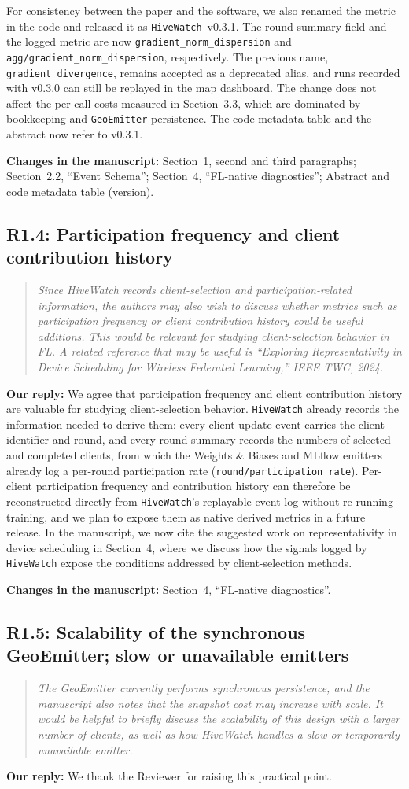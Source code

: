 \documentclass[11pt]{article}
\newenvironment{reviewer}{\begin{quote}\itshape\color{blue}}{\end{quote}}
\newcommand{\comment}[2]{\subsection*{R#1: #2}}
\newcommand{\response}{\noindent\textbf{Our reply:} }
\newcommand{\location}[1]{\noindent\textbf{Changes in the manuscript:} #1}
\newcommand{\HW}{\texttt{HiveWatch}}
\begin{document}
For consistency between the paper and the software, we also renamed the metric in the code and released it as \HW{}~v0.3.1. The round-summary field and the logged metric are now \texttt{gradient\_norm\_dispersion} and \texttt{agg/gradient\_norm\_dispersion}, respectively. The previous name, \texttt{gradient\_divergence}, remains accepted as a deprecated alias, and runs recorded with v0.3.0 can still be replayed in the map dashboard. The change does not affect the per-call costs measured in Section~3.3, which are dominated by bookkeeping and \texttt{GeoEmitter} persistence. The code metadata table and the abstract now refer to v0.3.1.

\location{Section~1, second and third paragraphs; Section~2.2, ``Event Schema''; Section~4, ``FL-native diagnostics''; Abstract and code metadata table (version).}

\comment{1.4}{Participation frequency and client contribution history}
\begin{reviewer}
Since HiveWatch records client-selection and participation-related information, the authors may also wish to discuss whether metrics such as participation frequency or client contribution history could be useful additions. This would be relevant for studying client-selection behavior in FL. A related reference that may be useful is ``Exploring Representativity in Device Scheduling for Wireless Federated Learning,'' IEEE TWC, 2024.
\end{reviewer}
\response We agree that participation frequency and client contribution history are valuable for studying client-selection behavior. \HW{} already records the information needed to derive them: every client-update event carries the client identifier and round, and every round summary records the numbers of selected and completed clients, from which the Weights \& Biases and MLflow emitters already log a per-round participation rate (\texttt{round/participation\_rate}). Per-client participation frequency and contribution history can therefore be reconstructed directly from \HW{}'s replayable event log without re-running training, and we plan to expose them as native derived metrics in a future release. In the manuscript, we now cite the suggested work on representativity in device scheduling in Section~4, where we discuss how the signals logged by \HW{} expose the conditions addressed by client-selection methods.

\location{Section~4, ``FL-native diagnostics''.}

\comment{1.5}{Scalability of the synchronous GeoEmitter; slow or unavailable emitters}
\begin{reviewer}
The GeoEmitter currently performs synchronous persistence, and the manuscript also notes that the snapshot cost may increase with scale. It would be helpful to briefly discuss the scalability of this design with a larger number of clients, as well as how HiveWatch handles a slow or temporarily unavailable emitter.
\end{reviewer}
\response We thank the Reviewer for raising this practical point.
\end{document}
